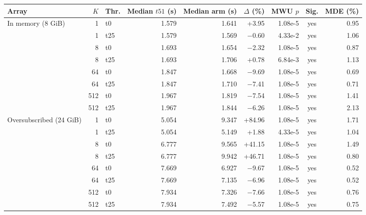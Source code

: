 \begin{tabular}{@{}lrlrrrrcr@{}}
\toprule
Array & $K$ & Thr. & Median $t51$ (s) & Median arm (s) & $\Delta$ (\%) & MWU $p$ & Sig. & MDE (\%) \\
\midrule
In memory (8 GiB) & 1 & t0 & 1.579 & 1.641 & +3.95 & 1.08e-5 & yes & 0.95 \\ %
 & 1 & t25 & 1.579 & 1.569 & $-$0.60 & 4.33e-2 & yes & 1.06 \\ %
 & 8 & t0 & 1.693 & 1.654 & $-$2.32 & 1.08e-5 & yes & 0.87 \\ %
 & 8 & t25 & 1.693 & 1.706 & +0.78 & 6.84e-3 & yes & 1.13 \\ %
 & 64 & t0 & 1.847 & 1.668 & $-$9.69 & 1.08e-5 & yes & 0.69 \\ %
 & 64 & t25 & 1.847 & 1.710 & $-$7.41 & 1.08e-5 & yes & 0.71 \\ %
 & 512 & t0 & 1.967 & 1.819 & $-$7.54 & 1.08e-5 & yes & 1.41 \\ %
 & 512 & t25 & 1.967 & 1.844 & $-$6.26 & 1.08e-5 & yes & 2.13 \\ %
\midrule
Oversubscribed (24 GiB) & 1 & t0 & 5.054 & 9.347 & +84.96 & 1.08e-5 & yes & 1.71 \\ %
 & 1 & t25 & 5.054 & 5.149 & +1.88 & 4.33e-5 & yes & 1.04 \\ %
 & 8 & t0 & 6.777 & 9.565 & +41.15 & 1.08e-5 & yes & 1.49 \\ %
 & 8 & t25 & 6.777 & 9.942 & +46.71 & 1.08e-5 & yes & 0.80 \\ %
 & 64 & t0 & 7.669 & 6.927 & $-$9.67 & 1.08e-5 & yes & 0.52 \\ %
 & 64 & t25 & 7.669 & 7.135 & $-$6.96 & 1.08e-5 & yes & 0.52 \\ %
 & 512 & t0 & 7.934 & 7.326 & $-$7.66 & 1.08e-5 & yes & 0.76 \\ %
 & 512 & t25 & 7.934 & 7.492 & $-$5.57 & 1.08e-5 & yes & 0.75 \\ %
\bottomrule
\end{tabular}
